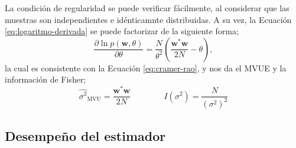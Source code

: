 La condición de regularidad se puede verificar fácilmente, al considerar que las muestras son independientes e idénticamnte distribuidas. A su vez, la Ecuación \ref{eq:logaritmo-derivada} se puede factorizar de la siguiente forma;
\begin{equation}\label{eq:logaritmo-derivada-factorizacion}
    \frac{\partial \ln p(\mathbf{w},\theta)}{\partial \theta} =  \frac{N}{\theta^2}\left(\frac{\mathbf{w}^\ast\mathbf{w}}{2N}-\theta\right),
\end{equation}
la cual es consistente con la Ecuación \ref{eq:cramer-rao}, y nos da el MVUE y la información de Fisher;
\begin{equation}\label{eq:expresion-mvue}
    \widehat{\sigma^2}_{\text{MVU}} = \frac{\mathbf{w}^\ast\mathbf{w}}{2N} \qquad\qquad I(\sigma^2) = \frac{N}{\left(\sigma^2\right)^2}
\end{equation}

\subsection{Desempeño del estimador}
\label{Ss:estimador-ruido-desempeño}

 
